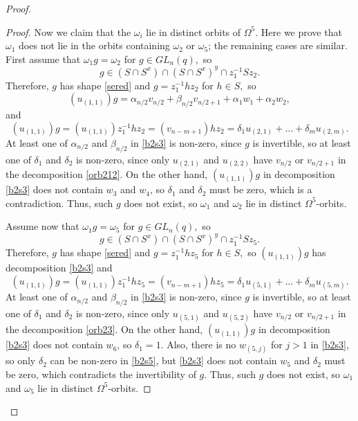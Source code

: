 \begin{proof}
\begin{proof}
Now we claim that the $\omega_i$ lie in distinct orbits of $\Omega^5.$ Here we prove that $\omega_1$ does not lie in the orbits containing $\omega_2$ or $\omega_5$; the remaining cases are similar.  First assume that $\omega_1 g =\omega_2$ for $g \in GL_n(q),$ so 
$$g \in (S \cap S^x) \cap (S \cap S^x)^y \cap z_1^{-1}Sz_2.$$
Therefore, $g$ has shape \eqref{sered} and $g=z_1^{-1}hz_2$ for $h \in S,$ so 
\begin{equation}\label{b2s3}
(u_{(1,1)})g=\alpha_{n/2} v_{n/2} + \beta_{n/2} v_{n/2+1} +\alpha_1 w_1 + \alpha_2 w_2,
\end{equation}
and 
\begin{equation}\label{b2s4}
(u_{(1,1)})g=(u_{(1,1)})z_1^{-1}hz_2=(v_{n-m+1})hz_2 = \delta_1 u_{(2,1)} + \ldots + \delta_m u_{(2,m)}.
\end{equation}
At least one of $\alpha_{n/2}$ and $\beta_{n/2}$ in \eqref{b2s3} is non-zero, since $g$ is invertible,   so at least one of $\delta_1$ and $\delta_2$ is non-zero, since only $u_{(2,1)}$ and $u_{(2,2)}$ have $v_{n/2}$ or $v_{n/2+1}$ in the decomposition \eqref{orb212}.  On the other hand, $(u_{(1,1)})g$ in decomposition \eqref{b2s3} does not contain $w_3$ and $w_4$, so $\delta_1$ and $\delta_2$ must be zero, which is a contradiction. Thus, such $g$ does not exist, so $\omega_1$ and $\omega_2$ lie in distinct $\Omega^5$-orbits.

Assume now      that $\omega_1 g =\omega_5$ for $g \in GL_n(q),$ so 
$$g \in (S \cap S^x) \cap (S \cap S^x)^y \cap z_1^{-1}Sz_5.$$
Therefore, $g$ has shape \eqref{sered} and $g=z_1^{-1}hz_5$ for $h \in S,$ so 
$(u_{(1,1)})g$ has decomposition \eqref{b2s3}
and 
\begin{equation}\label{b2s5}
(u_{(1,1)})g=(u_{(1,1)})z_1^{-1}hz_5=(v_{n-m+1})hz_5 = \delta_1 u_{(5,1)} + \ldots + \delta_m u_{(5,m)}.
\end{equation}
At least one of $\alpha_{n/2}$ and $\beta_{n/2}$ in \eqref{b2s3} is non-zero, since $g$ is invertible,   so at least one of $\delta_1$ and $\delta_2$ is non-zero, since only $u_{(5,1)}$ and $u_{(5,2)}$ have $v_{n/2}$ or $v_{n/2+1}$ in the decomposition \eqref{orb23}.  On the other hand, $(u_{(1,1)})g$ in decomposition \eqref{b2s3} does not contain $w_6$, so $\delta_1=1.$ Also, there is no $w_{(5,j)}$ for $j>1$ in \eqref{b2s3}, so only $\delta_2$ can be non-zero in \eqref{b2s5}, but \eqref{b2s3} does not contain $w_5$ and $\delta_2$ must be zero, which  contradicts the invertibility of $g$. Thus, such $g$ does not exist, so $\omega_1$ and $\omega_5$ lie in distinct $\Omega^5$-orbits.


\end{proof}
\end{proof}
